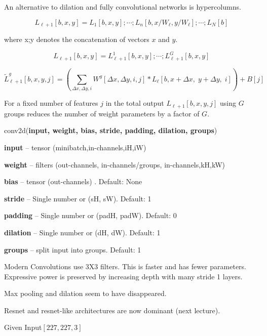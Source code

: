 {

An alternative to dilation and fully convolutional networks is hypercolumns.

\vfill
$$L_{\ell+1}[b,x,y] = L_1[b,x,y];\cdots;L_n[b,x/W_\ell,y/W_\ell];\cdots;L_N[b]$$

\vfill
where x;y denotes the concatenation of vectors $x$ and $y$.


$$L_{\ell+1}[b,x,y] = L^1_{\ell+1}[b,x,y];\cdots;L^G_{\ell+1}[b,x,y]$$

\vfill
$$\tilde{L}^g_{{\ell+1}}[b,x,y,j] = \left(\sum_{\Delta x, \Delta y, i} W^g[\Delta x, \Delta y, i, j] *L_{{\ell}}[b,x + \Delta x,\; y + \Delta y,\; i]\right) + B[j]$$

\vfill
For a fixed number of features $j$ in the total output $L_{\ell+1}[b,x,y,j]$ using $G$ groups reduces the number of weight parameters by a factor of $G$.



conv2d({\bf input, weight, bias, stride, padding, dilation, groups})

\bigskip
{\bf input} – tensor (minibatch,in-channels,iH,iW)

\medskip
{\bf weight} – filters (out-channels, in-channels/groups, in-channels,kH,kW)

\medskip
{\bf bias} – tensor (out-channels) . Default: None

\medskip
{\bf stride} – Single number or (sH, sW). Default: 1

\medskip
{\bf padding} – Single number or (padH, padW). Default: 0

\medskip
{\bf dilation} – Single number or (dH, dW). Default: 1

\medskip
{\bf groups} – split input into groups. Default: 1


Modern Convolutions use 3X3 filters.  This is faster and has fewer parameters.  Expressive power is preserved by increasing depth with many stride 1 layers.

\vfill
Max pooling and dilation seem to have disappeared.

\vfill
Resnet and resnet-like architectures are now dominant (next lecture).

{\huge
\centerline{Given Input$[227,227,3]$}

}}
